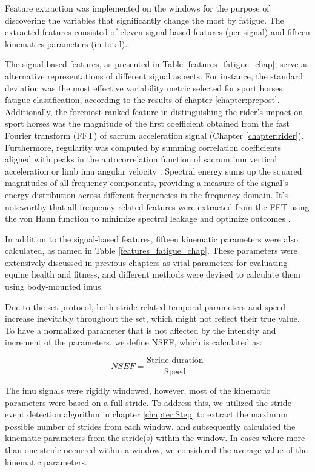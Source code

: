 Feature extraction was implemented on the windows for the purpose of discovering the variables that significantly change the most by fatigue. The extracted features consisted of eleven signal-based features (per signal) and fifteen kinematics parameters (in total). 

The signal-based features, as presented in Table \ref{features_fatigue_chap}, serve as alternative representations of different signal aspects. For instance, the standard deviation was the most effective variability metric selected for sport horses fatigue classification, according to the results of chapter \ref{chapter:prepost}. Additionally, the foremost ranked feature in distinguishing the rider's impact on sport horses was the magnitude of the first coefficient obtained from the fast Fourier transform (FFT) of sacrum acceleration signal (Chapter \ref{chapter:rider}). Furthermore, regularity was computed by summing correlation coefficients aligned with peaks in the autocorrelation function of sacrum \gls{imu} vertical acceleration or limb \gls{imu} angular velocity \cite{Biau2004-mn}. Spectral energy sums up the squared magnitudes of all frequency components, providing a measure of the signal's energy distribution across different frequencies in the frequency domain. It's noteworthy that all frequency-related features were extracted from the FFT using the von Hann function to minimize spectral leakage and optimize outcomes \cite{smith1997scientist}.



In addition to the signal-based features, fifteen kinematic parameters were also calculated, as named in Table \ref{features_fatigue_chap}. These parameters were extensively discussed in previous chapters as vital parameters for evaluating equine health and fitness, and different methods were devised to calculate them using body-mounted \gls{imu}s.

Due to the \gls{set} protocol, both stride-related temporal parameters and speed increase inevitably throughout the \gls{set}, which might not reflect their true value. To have a normalized parameter that is not affected by the intensity and increment of the parameters, we define NSEF, which is calculated as:

\begin{equation}NSEF=\dfrac{\text{Stride duration}}{\text{Speed}}\end{equation}
	
The \gls{imu} signals were rigidly windowed, however, most of the kinematic parameters were based on a full stride. To address this, we utilized the stride event detection algorithm in chapter \ref{chapter:Step} to extract the maximum possible number of strides from each window, and subsequently calculated the kinematic parameters from the stride(s) within the window. In cases where more than one stride occurred within a window, we considered the average value of the kinematic parameters.



